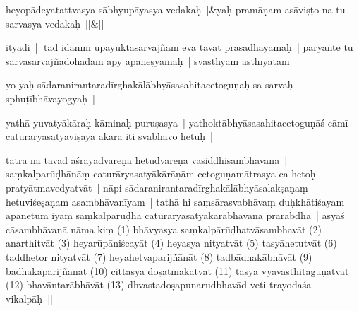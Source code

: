 \documentclass[article,12pt,a4paper]{memoir}%
\newcounter{parCount}
\begin{document}
	    
	    \stanza[\smallbreak]
	  heyopādeyatattvasya sābhyupāyasya vedakaḥ |&yaḥ pramāṇam asāviṣṭo na tu sarvasya vedakaḥ ||\&[\smallbreak]
	  
	  
	  

	  
	  \pstart \leavevmode%
	ityādi || tad idānīm upayuktasarvajñam eva tāvat prasādhayāmaḥ | paryante tu sarvasarvajñadohadam apy apaneṣyāmaḥ | svāsthyam āsthīyatām | 
	{}
	\pend%
      

	  
	  \pstart \leavevmode%
	\label{thakur75-1.20}yo yaḥ sādaranirantaradīrghakālābhyāsasahitacetoguṇaḥ sa sarvaḥ sphuṭībhāvayogyaḥ | 
	{}
	\pend%
      

	  
	  \pstart \leavevmode%
	yathā yuvatyākāraḥ kāminaḥ puruṣasya | yathoktābhyāsasahitacetoguṇāś cāmī caturāryasatyaviṣayā ākārā iti svabhāvo hetuḥ | 
	{}
	\pend%
      

	  
	  \pstart \leavevmode%
	\label{thakur75-1.23}tatra na tāvād āśrayadvāreṇa hetudvāreṇa vāsiddhisambhāvanā | saṃkalparūḍhānāṃ caturāryasatyākārāṇām \label{ratnakīrtinibandhāvali__36r1PF7IMWZB49IEX1VY8ZG8MD3}cetoguṇa\label{ratnakīrtinibandhāvali__36r1PF7IMWZ43B0FVQSP9MJDYEH}mātrasya ca hetoḥ pratyātmavedyatvāt | nāpi sādaranirantaradīrghakālābhyāsalakṣaṇaṃ hetuviśeṣaṇam asambhāvanīyam | tathā hi saṃsārasvabhāvaṃ duḥkhātiśayam apanetum iyaṃ saṃkalpārūḍhā caturāryasatyākārabhāvanā prārabdhā | asyāś cāsambhāvanā nāma kiṃ (1) bhāvyasya saṃkalpārūḍhatvāsambhavāt (2) anarthitvāt (3) heyarūpāniścayāt (4) heyasya nityatvāt (5) tasyāhetutvāt (6) taddhetor nityatvāt (7) heyahetvaparijñānāt (8) tadbādhakābhāvāt (9) bādhakāparijñānāt (10) cittasya doṣātmakatvāt (11) tasya vyavasthitaguṇatvāt (12) bhavāntarābhāvāt (13) dhvastadoṣapunarudbhavād veti trayodaśa vikalpāḥ ||
	{}
	\pend%
      
\end{document}
